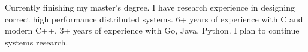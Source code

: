 

\begin{cvparagraph}

Currently finishing my master's degree. I have research experience in designing correct high performance distributed systems. 6+ years of experience with C and modern C++, 3+ years of experience with Go, Java, Python. I plan to continue systems research.
\end{cvparagraph}
